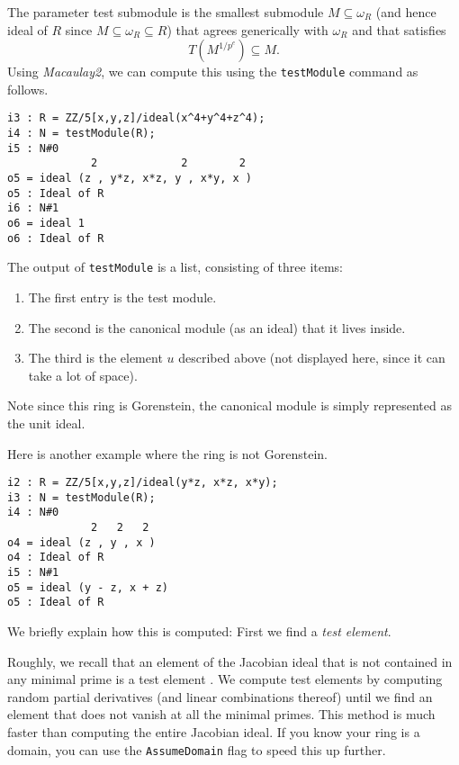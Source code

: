 \documentclass[11pt]{amsart}
\begin{document}
The parameter test submodule is the smallest submodule $M \subseteq \omega_R$ (and hence ideal of $R$ since $M \subseteq \omega_R \subseteq R$) that agrees generically with $\omega_R$ and that satisfies
\[
T (M^{1/p^e}) \subseteq M.
\]
Using \emph{Macaulay2}, we can compute this using the \texttt{testModule} command as follows.
\begin{verbatim}
i3 : R = ZZ/5[x,y,z]/ideal(x^4+y^4+z^4);
i4 : N = testModule(R);
i5 : N#0
             2             2        2
o5 = ideal (z , y*z, x*z, y , x*y, x )
o5 : Ideal of R
i6 : N#1
o6 = ideal 1
o6 : Ideal of R
\end{verbatim}
The output of \texttt{testModule} is a list, consisting of three items:
\begin{enumerate}
\item The first entry is the test module.
\item The second is the canonical module (as an ideal) that it lives inside.  
\item The third is the element $u$ described above (not displayed here, since it can take a lot of space).  
\end{enumerate}
Note since this ring is Gorenstein, the canonical module is simply represented as the unit ideal.

Here is another example where the ring is not Gorenstein.
\begin{verbatim}
i2 : R = ZZ/5[x,y,z]/ideal(y*z, x*z, x*y);
i3 : N = testModule(R);
i4 : N#0
             2   2   2
o4 = ideal (z , y , x )
o4 : Ideal of R
i5 : N#1
o5 = ideal (y - z, x + z)
o5 : Ideal of R
\end{verbatim}

We briefly explain how this is computed:  First we find a \emph{test element}.
\begin{remark}
\label{rem.ComputationOfTestElements}
Roughly, we recall that an element of the Jacobian ideal that is not contained in any minimal prime is a test element \cite{HochsterFoundations}.  We compute test elements by computing random partial derivatives (and linear combinations thereof) until we find an element that does not vanish at all the minimal primes.  This method is much faster than computing the entire Jacobian ideal.  If you know your ring is a domain, you can use the \texttt{AssumeDomain} flag to speed this up further.
\end{remark}
\end{document}
